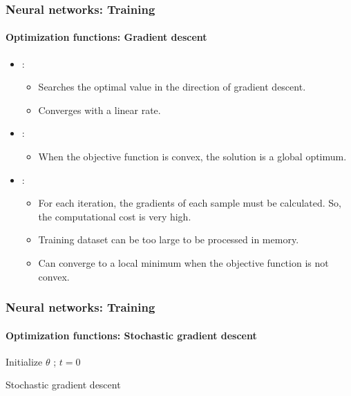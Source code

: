 \documentclass[xcolor=table]{beamer}
\begin{document}
\begin{frame}
	\frametitle{Neural networks: Training}
	\framesubtitle{Optimization functions: Gradient descent}

\begin{itemize}
	\item {}: 
	\begin{itemize}
		\item Searches the optimal value in the direction of gradient descent.
		\item Converges with a linear rate.
	\end{itemize}
	\item {}: 
	\begin{itemize}
		\item When the objective function is convex, the solution is a global optimum.
	\end{itemize}
	\item {}: 
	\begin{itemize}
		\item For each iteration, the gradients of each sample must be calculated. 
		So, the computational cost is very high. 
		\item Training dataset can be too large to be processed in memory.
		\item Can converge to a local minimum when the objective function is not convex.
	\end{itemize}
\end{itemize}

\end{frame}

\begin{frame}
	\frametitle{Neural networks: Training}
	\framesubtitle{Optimization functions: Stochastic gradient descent}

\begin{algorithm}[H]
	\KwResult{$ \theta $}
	Initialize $ \theta $ ; $ t = 0 $\;
	\caption{Stochastic gradient descent}
\end{algorithm}

\end{frame}
\end{document}
